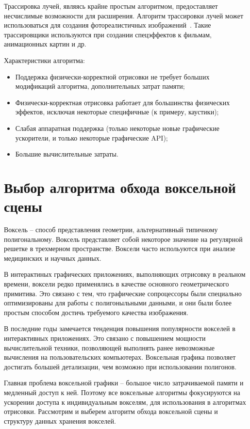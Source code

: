 Трассировка лучей, являясь крайне простым алгоритмом, предоставляет несчислимые возможности для 
расширения. Алгоритм трассировки лучей может использоваться для создания фотореалистичных
изображений~\cite{PBRT3e}. Такие трассировщики используются при создании спецэффектов к фильмам, 
анимационных картин и др. 

Характеристики алгоритма:
\begin{itemize}[label*=---]
    \item Поддержка физически-корректной отрисовки не требует больших модификаций алгоритма,
        дополнительных затрат памяти;
    \item Физически-корректная отрисовка работает для большинства физических эффектов,
        исключая некоторые специфичные (к примеру, каустики);
    \item Слабая аппаратная поддержка (только некоторые новые графические ускорители, и только 
        некоторые графические API);
    \item Большие вычислительные затраты.
\end{itemize}

\section{Выбор алгоритма обхода воксельной сцены}

Воксель -- способ представления геометрии, альтернативный типичному
полигональному. Воксель представляет собой некоторое значение на регулярной решетке в 
трехмерном пространстве. Воксели часто испольуются при анализе медицинских и научных
данных.

В интерактиных графических приложениях, выполняющих отрисовку в реальном времени, воксели 
редко применялись в качестве основного геометрического примитива. Это связано с тем, что
графические сопроцессоры были специально оптимизированы для работы с полигоныльными данными,
и они были более простым способом достичь требуемого качества изображения. 

В последние годы замечается тенденция повышения популярности вокселей в интерактивных приложениях.
Это связано с повышением мощности вычислительной техники, позволяющей выполнять ранее невозможные
вычисления на пользовательских компьютерах. Воксельная графика позволяет достигать большей детализации,
чем возможно при использовании полигонов. 

Главная проблема воксельной графики -- большое число затрачиваемой памяти и медленный доступ к ней.
Поэтому все воксельные алгоритмы фокусируются на ускорении доступа к индивидуальным вокселям, для
использования в алгоритмах отрисовки. Рассмотрим и выберем алгоритм обхода воксельной сцены и 
структуру данных хранения вокселей.

